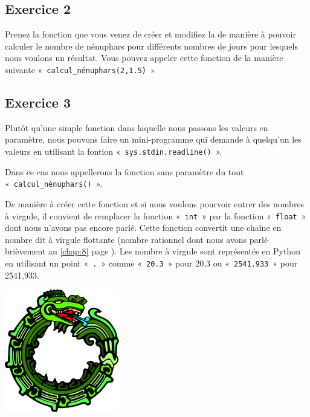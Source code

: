 \subsection{Exercice 2}
Prenez la fonction que vous venez de créer et modifiez la de manière à pouvoir calculer le nombre de nénuphars pour différents nombres de jours pour lesquels nous voulons un résultat.
Vous pouvez appeler cette fonction de la manière suivante «~\texttt{calcul\_nénuphars(2,1.5)}~» 

\subsection{Exercice 3}
Plutôt qu'une simple fonction dans laquelle nous passons les valeurs en paramètre, nous pouvons faire un mini-programme qui demande à quelqu'un les valeurs en utilisant la fontion «~\texttt{sys.stdin.readline()}~».

Dans ce cas nous appellerons la fonction sans paramètre du tout «~\texttt{calcul\_nénuphars()}~».

De manière à créer cette fonction et si nous voulons pourvoir entrer des nombres à virgule, il convient de remplacer la fonction «~\texttt{int}~» par la fonction «~\texttt{float}~» dont nous n'avons pas encore parlé.
Cette fonction convertit une chaîne en nombre dit à virgule flottante (nombre rationnel dont nous avons parlé brièvement au \autoref{chap:8} page \pageref{chap:8}). Les nombre à virgule sont représentés en Python en utilisant un point «~\texttt{.}~» comme «~\texttt{20.3}~» pour 20,3 ou «~\texttt{2541.933}~»  pour 2541,933.


 \vfill
\begin{center}
 \includegraphics[width=5cm]{images/ourochin.pdf}
\end{center}
 \vfill